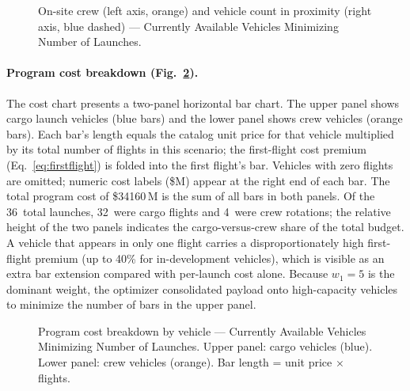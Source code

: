\begin{figure}[htbp]
  \centering
  \resizebox{0.75\textwidth}{!}{}
  \caption{On-site crew (left axis, orange) and vehicle
           count in proximity (right axis, blue dashed) ---
           Currently Available Vehicles Minimizing Number of Launches.}
  \label{fig:resources_1}
\end{figure}

\paragraph{Program cost breakdown (Fig.~\ref{fig:cost_1}).}
The cost chart presents a two-panel horizontal bar chart.
The upper panel shows cargo launch vehicles (blue bars) and the
lower panel shows crew vehicles (orange bars).
Each bar's length equals the catalog unit price for that vehicle
multiplied by its total number of flights in this scenario; the
first-flight cost premium (Eq.~\ref{eq:firstflight}) is folded
into the first flight's bar.
Vehicles with zero flights are omitted; numeric cost labels
(\$M) appear at the right end of each bar.
The total program cost of \$34160\,M
is the sum of all bars in both panels.
Of the 36~total launches,
32~were cargo flights and 4~were
crew rotations; the relative height of the two panels indicates
the cargo-versus-crew share of the total budget.
A vehicle that appears in only one flight carries a
disproportionately high first-flight premium (up to 40\% for
in-development vehicles), which is visible as an extra bar
extension compared with per-launch cost alone.
Because $w_1 = 5$ is the
dominant weight, the optimizer consolidated payload onto
high-capacity vehicles to minimize the number of bars
in the upper panel.

\begin{figure}[htbp]
  \centering
  \resizebox{0.75\textwidth}{!}{}
  \caption{Program cost breakdown by vehicle ---
           Currently Available Vehicles Minimizing Number of Launches.
           Upper panel: cargo vehicles (blue).
           Lower panel: crew vehicles (orange).
           Bar length = unit price $\times$ flights.}
  \label{fig:cost_1}
\end{figure}

